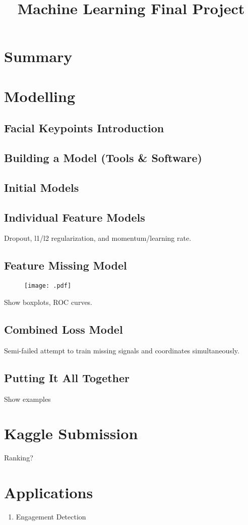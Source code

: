 \documentclass[conference]{IEEEtran}
\begin{document}
\title{Machine Learning Final Project}
\author{
\and
{}
}

\maketitle

\section{Summary}

\section{Modelling}
\subsection{Facial Keypoints Introduction}
\subsection{Building a Model (Tools \& Software)}
\subsection{Initial Models}
\subsection{Individual Feature Models}
Dropout, l1/l2 regularization, and momentum/learning rate.
\subsection{Feature Missing Model}
\begin{figure}[!htb]
  \centering
  \caption{}
  \texttt{[image: .pdf]}
  \label{fig:}
\end{figure}

Show boxplots, ROC curves.
\subsection{Combined Loss Model}
Semi-failed attempt to train missing signals and coordinates simultaneously.
\subsection{Putting It All Together}
Show examples

\section{Kaggle Submission}
Ranking?

\section{Applications}
\begin{enumerate}
\item Engagement Detection
\end{enumerate}
\end{document}
